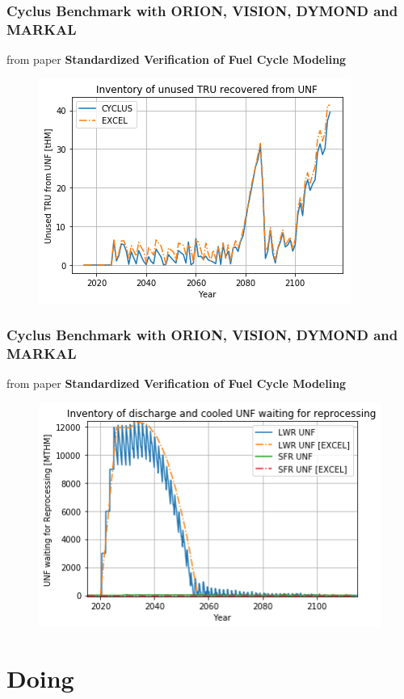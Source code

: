 \documentclass[9pt]{beamer}
\begin{document}
\begin{frame}
    \frametitle{Cyclus Benchmark with ORION, VISION, DYMOND and MARKAL}
    from paper \textbf{Standardized Verification of Fuel Cycle Modeling}
    \begin{figure}[htbp!]
        \begin{center}
                \includegraphics[width=.7\textwidth]{./images/verification/tru.png}
        \end{center}
    \end{figure}

\end{frame}


\begin{frame}
    \frametitle{Cyclus Benchmark with ORION, VISION, DYMOND and MARKAL}
    from paper \textbf{Standardized Verification of Fuel Cycle Modeling}
    \begin{figure}[htbp!]
        \begin{center}
                \includegraphics[width=.7\textwidth]{./images/verification/waiting_monthly.png}
        \end{center}
    \end{figure}

\end{frame}

\section{Doing}
\end{document}
